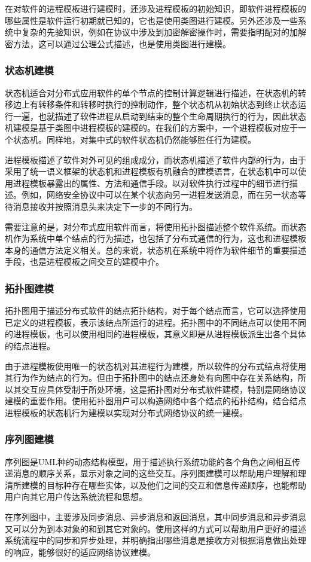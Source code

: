 在对软件的进程模板进行建模时，还涉及进程模板的初始知识，即软件进程模板的哪些属性是软件运行初期就已知的，它也是使用类图进行建模。另外还涉及一些系统中复杂的先验知识，例如在协议中涉及到加密解密操作时，需要指明配对的加解密方法，这可以通过公理公式描述，也是使用类图进行建模。

\subsubsection{状态机建模}
状态机适合对分布式应用软件的单个节点的控制计算逻辑进行描述，在状态机的转移边上有转移条件和转移时执行的控制动作，整个状态机从初始状态到终止状态运行一遍，也就描述了软件进程从启动到结束的整个生命周期执行的行为，因此状态机建模是基于类图中进程模板的建模的。在我们的方案中，一个进程模板对应于一个状态机。同样地，对集中式的软件状态机仍然能够胜任行为建模。
\par
进程模板描述了软件对外可见的组成成分，而状态机描述了软件内部的行为，由于采用了统一语义框架的状态机和进程模板有机融合的建模语言，在状态机中可以使用进程模板暴露出的属性、方法和通信手段。以对软件执行过程中的细节进行描述。例如，网络安全协议中可以在某个状态向另一进程发送消息，而在另一状态等待消息接收并按照消息头来决定下一步的不同行为。
\par
需要注意的是，对分布式应用软件而言，将使用拓扑图描述整个软件系统。而状态机作为系统中单个结点的行为描述，也包括了分布式通信的行为，这也和进程模板本身的通信方法定义相关。总的来说，状态机在系统中将作为软件细节的重要描述手段，也是进程模板之间交互的建模中介。

\subsubsection{拓扑图建模}
拓扑图用于描述分布式软件的结点拓扑结构，对于每个结点而言，它可以选择使用已定义的进程模板，表示该结点所运行的进程。拓扑图中的不同结点可以使用不同的进程模板，也可以使用相同的进程模板，其意义即是从进程模板派生出各个具体的结点进程。
\par
由于进程模板使用唯一的状态机对其进程行为建模，所以软件的分布式结点将使用其行为作为结点的行为。但由于拓扑图中的结点还身处有向图中存在关系结构，所以其交互应具体受制于所处环境，这是拓扑图对分布式软件建模，特别是网络协议建模的重要作用。使用拓扑图用户可以构造网络中各个结点的拓扑结构，结合结点进程模板的状态机行为建模以实现对分布式网络协议的统一建模。

\subsubsection{序列图建模}
序列图是UML种的动态结构模型，用于描述执行系统功能的各个角色之间相互传递消息的顺序关系，显示对象之间的这些交互。序列图建模可以帮助用户理解和理清所建模的目标种存在哪些实体，以及他们之间的交互和信息传递顺序，也能帮助用户向其它用户传达系统流程和思想。
\par
在序列图中，主要涉及同步消息、异步消息和返回消息，其中同步消息和异步消息又可以分为到本对象的和到其它对象的。使用这样的方式可以帮助用户更好的描述系统流程中的同步和异步处理，并明确指出哪些消息是接收方对根据消息做出处理的响应，能够很好的适应网络协议建模。


